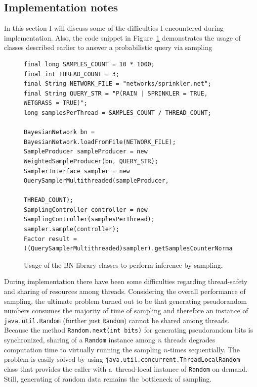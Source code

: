 \documentclass[english,cover]{fitthesis} %
\newcommand{\srccode}[1]{{\tt #1}}         %
\begin{document}
\subsection{Implementation notes}
In this section I will discuss some of the difficulties I encountered during implementation. Also, the code snippet in Figure~\ref{fig:snippet-sampling} demonstrates the usage of classes described earlier to answer a probabilistic query via sampling

\begin{figure}[ht]
\begin{center}
\begin{verbatim}
final long SAMPLES_COUNT = 10 * 1000;
final int THREAD_COUNT = 3;
final String NETWORK_FILE = "networks/sprinkler.net";
final String QUERY_STR = "P(RAIN | SPRINKLER = TRUE, WETGRASS = TRUE)";
long samplesPerThread = SAMPLES_COUNT / THREAD_COUNT;

BayesianNetwork bn = BayesianNetwork.loadFromFile(NETWORK_FILE);
SampleProducer sampleProducer = new WeightedSampleProducer(bn, QUERY_STR);
SamplerInterface sampler = new QuerySamplerMultithreaded(sampleProducer,
                                                         THREAD_COUNT);
SamplingController controller = new SamplingController(samplesPerThread);
sampler.sample(controller);
Factor result = ((QuerySamplerMultithreaded)sampler).getSamplesCounterNormalized();
\end{verbatim}
\end{center}
\caption{Usage of the BN library classes to perform inference by sampling.}
\label{fig:snippet-sampling}
\end{figure}

During implementation there have been some difficulties regarding thread-safety and sharing of resources among threads. Considering the overall performance of sampling, the ultimate problem turned out to be that generating pseudorandom numbers consumes the majority of time of sampling and therefore an instance of \srccode{java.util.Random} (further just \srccode{Random}) cannot be shared among threads. Because the method \srccode{Random.next(int bits)} for generating pseudorandom bits is synchronized, sharing of a \srccode{Random} instance among $n$ threads degrades computation time to virtually running the sampling $n$-times sequentially. The problem is easily solved by using \srccode{java.util.concurrent.ThreadLocalRandom} class that provides the caller with a~thread-local instance of \srccode{Random} on demand. Still, generating of random data remains the bottleneck of sampling.
\end{document}
